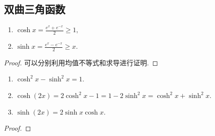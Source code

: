 \documentclass[../../main.tex]{subfiles}%
\begin{document}
\subsection{双曲三角函数}

\begin{proposition}
\begin{enumerate}[(1)]
\item $\cosh x=\frac{e^{x}+e^{-x}}{2}\geqslant1,$

\item $\sinh x=\frac{e^{x}-e^{-x}}{2}\geqslant x.$
\end{enumerate}
\end{proposition}
\begin{proof}
可以分别利用均值不等式和求导进行证明. 
\end{proof}

\begin{proposition}\label{proposition:双曲三角函数基本性质}
\begin{enumerate}
\item $\cosh^2 x-\sinh^2 x=1$.

\item $\cosh(2x)=2\cosh^2 x-1=1-2\sinh^2 x=\cosh^2 x+\sinh^2 x$.

\item $\sinh(2x)=2\sinh x\cosh x$. 
\end{enumerate}
\end{proposition}
\begin{proof}

\end{proof}
\end{document}
